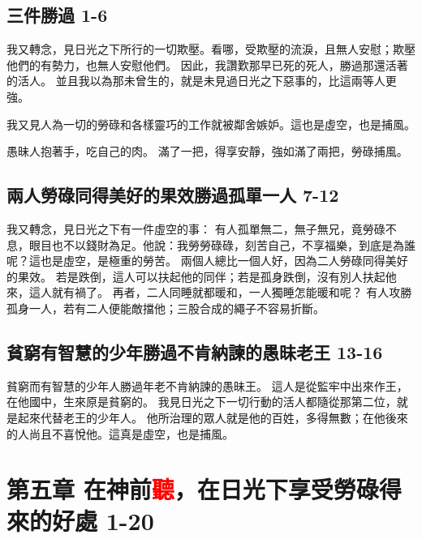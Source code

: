 \subsection{三件勝過 1-6}
我又轉念，見日光之下所行的一切欺壓。看哪，受欺壓的流淚，且無人安慰；欺壓他們的有勢力，也無人安慰他們。
因此，我讚歎那早已死的死人，勝過那還活著的活人。
並且我以為那未曾生的，就是未見過日光之下惡事的，比這兩等人更強。

我又見人為一切的勞碌和各樣靈巧的工作就被鄰舍嫉妒。這也是虛空，也是捕風。

愚昧人抱著手，吃自己的肉。
滿了一把，得享安靜，強如滿了兩把，勞碌捕風。

\subsection{兩人勞碌同得美好的果效勝過孤單一人 7-12}
我又轉念，見日光之下有一件虛空的事：
有人孤單無二，無子無兄，竟勞碌不息，眼目也不以錢財為足。他說：我勞勞碌碌，刻苦自己，不享福樂，到底是為誰呢？這也是虛空，是極重的勞苦。
兩個人總比一個人好，因為二人勞碌同得美好的果效。
若是跌倒，這人可以扶起他的同伴；若是孤身跌倒，沒有別人扶起他來，這人就有禍了。
再者，二人同睡就都暖和，一人獨睡怎能暖和呢？
有人攻勝孤身一人，若有二人便能敵擋他；三股合成的繩子不容易折斷。

\subsection{貧窮有智慧的少年勝過不肯納諫的愚昧老王 13-16}
貧窮而有智慧的少年人勝過年老不肯納諫的愚昧王。
這人是從監牢中出來作王，在他國中，生來原是貧窮的。
我見日光之下一切行動的活人都隨從那第二位，就是起來代替老王的少年人。
他所治理的眾人就是他的百姓，多得無數；在他後來的人尚且不喜悅他。這真是虛空，也是捕風。


\section{第五章 在神前\textcolor{red}{聽}，在日光下享受勞碌得來的好處 1-20}
